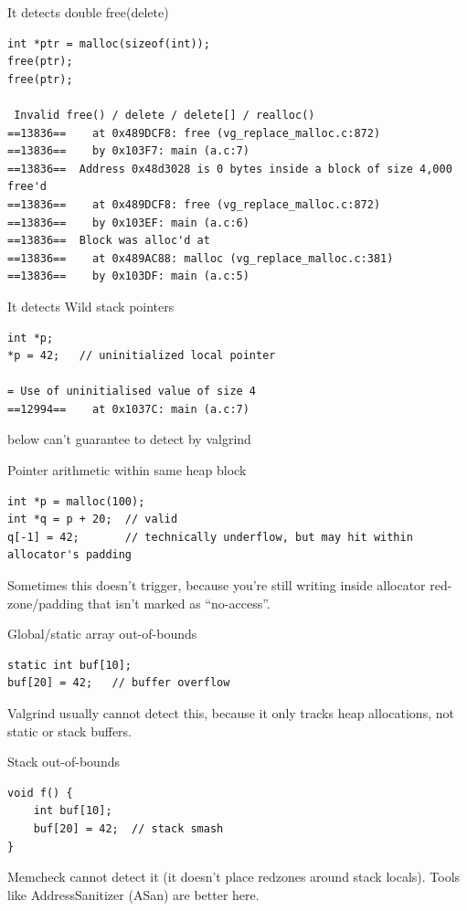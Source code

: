 \documentclass[paper=8.5in:11in, twoside, 12pt, pagesize=pdftex]{book}
\begin{document}
It detects double free(delete)
\begin{lstlisting}
int *ptr = malloc(sizeof(int));
free(ptr);
free(ptr);

 Invalid free() / delete / delete[] / realloc()
==13836==    at 0x489DCF8: free (vg_replace_malloc.c:872)
==13836==    by 0x103F7: main (a.c:7)
==13836==  Address 0x48d3028 is 0 bytes inside a block of size 4,000 free'd
==13836==    at 0x489DCF8: free (vg_replace_malloc.c:872)
==13836==    by 0x103EF: main (a.c:6)
==13836==  Block was alloc'd at
==13836==    at 0x489AC88: malloc (vg_replace_malloc.c:381)
==13836==    by 0x103DF: main (a.c:5)
\end{lstlisting}


It detects Wild stack pointers
\begin{lstlisting}
int *p; 
*p = 42;   // uninitialized local pointer

= Use of uninitialised value of size 4
==12994==    at 0x1037C: main (a.c:7)
\end{lstlisting}






below can't guarantee to detect by valgrind 



Pointer arithmetic within same heap block
\begin{lstlisting}
int *p = malloc(100);
int *q = p + 20;  // valid
q[-1] = 42;       // technically underflow, but may hit within allocator's padding
\end{lstlisting}

Sometimes this doesn’t trigger, because you’re still writing inside allocator red-zone/padding that isn’t marked as “no-access”.

Global/static array out-of-bounds
\begin{lstlisting}
static int buf[10];
buf[20] = 42;   // buffer overflow

\end{lstlisting}


Valgrind usually cannot detect this, because it only tracks heap allocations, not static or stack buffers.

Stack out-of-bounds
\begin{lstlisting}
void f() {
    int buf[10];
    buf[20] = 42;  // stack smash
}

\end{lstlisting}
Memcheck cannot detect it (it doesn’t place redzones around stack locals).
Tools like AddressSanitizer (ASan) are better here.
\end{document}
